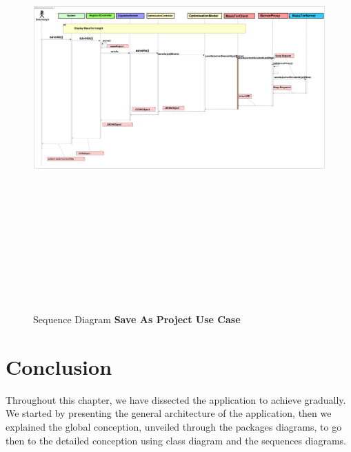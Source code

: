 	
    \pagebreak
	\clearpage
	\newpage
	\begin{figure}[h]
	\centering
	\includegraphics[width=17.5cm,height=17cm]{SequenceDiagramSaveAsProject.png}
	\caption{Sequence Diagram \textbf{Save As Project Use Case}}
    \end{figure}
    
 \pagebreak
\clearpage
\newpage
 \pagebreak
\clearpage
\newpage
	\section{Conclusion}
	Throughout this chapter, we have dissected the application to achieve gradually.
	We started by presenting the general architecture of the application, then we explained the global conception, unveiled through the packages diagrams, to go then to the detailed conception using class diagram and the sequences diagrams.  
